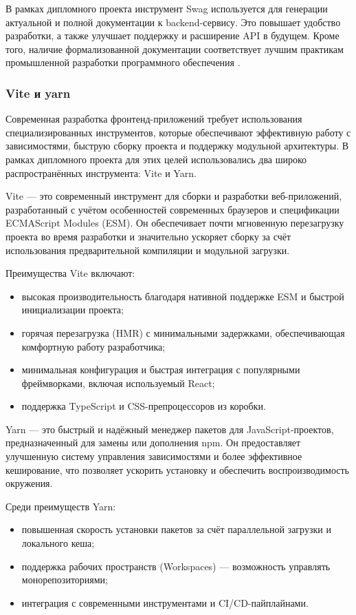 \documentclass[diploma]{SCWorks}
\begin{document}
В рамках дипломного проекта инструмент Swag используется для генерации 
актуальной и полной документации к backend-сервису. Это повышает удобство 
разработки, а также улучшает поддержку и расширение API в будущем. Кроме того, 
наличие формализованной документации соответствует лучшим практикам 
промышленной разработки программного обеспечения \cite{swag}.

\subsubsection{Vite и yarn}

Современная разработка фронтенд-приложений требует использования 
специализированных инструментов, которые обеспечивают эффективную работу с 
зависимостями, быструю сборку проекта и поддержку модульной архитектуры. 
В рамках дипломного проекта для этих целей использовались два широко 
распространённых инструмента: Vite и Yarn.

Vite — это современный инструмент для сборки и разработки веб-приложений, 
разработанный с учётом особенностей современных браузеров и спецификации 
ECMAScript Modules (ESM). Он обеспечивает почти мгновенную перезагрузку 
проекта во время разработки и значительно ускоряет сборку за счёт 
использования предварительной компиляции и модульной загрузки.

Преимущества Vite включают:
\begin{itemize}
    \item высокая производительность благодаря нативной поддержке ESM и 
    быстрой инициализации проекта;
    \item горячая перезагрузка (HMR) с минимальными задержками, обеспечивающая 
    комфортную работу разработчика;
    \item минимальная конфигурация и быстрая интеграция с 
    популярными фреймворками, включая используемый React;
    \item поддержка TypeScript и CSS-препроцессоров из коробки.
\end{itemize}

Yarn — это быстрый и надёжный менеджер пакетов для JavaScript-проектов, 
предназначенный для замены или дополнения npm. Он предоставляет улучшенную 
систему управления зависимостями и более эффективное кеширование, что 
позволяет ускорить установку и обеспечить воспроизводимость окружения.

Среди преимуществ Yarn:
\begin{itemize}
    \item повышенная скорость установки пакетов за счёт параллельной загрузки 
    и локального кеша;
    \item поддержка рабочих пространств (Workspaces) — возможность управлять 
    монорепозиториями;
    \item интеграция с современными инструментами и CI/CD-пайплайнами.
\end{itemize}
\end{document}
